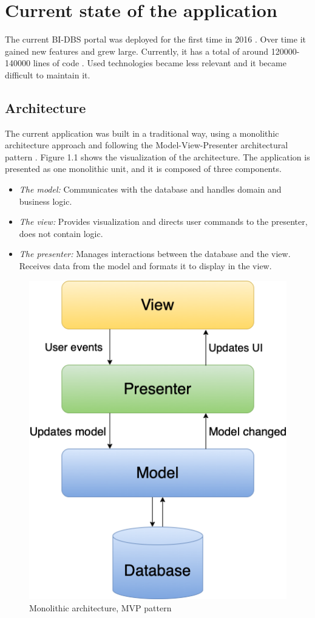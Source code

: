 \section{Current state of the application}
The current BI-DBS portal was deployed for the first time in 2016 \cite{bt-malec}. Over time it gained new features and grew large. Currently, it has a total of around 120000-140000 lines of code \cite{mt-plyskach}. Used technologies became less relevant and it became difficult to maintain it.

\subsection{Architecture}
The current application was built in a traditional way, using a monolithic architecture approach and following the Model-View-Presenter architectural pattern \cite{mvp-potel} \cite{architecture-haris}. Figure 1.1 shows the visualization of the architecture. The application is presented as one monolithic unit, and it is composed  of three components. 

\begin{itemize}
  \item \emph{The model:} Communicates with the database and handles domain and business logic.
  \item \emph{The view:} Provides visualization and directs user commands to the presenter, does not contain logic.
  \item \emph{The presenter:} Manages interactions between the database and the view. Receives data from the model and formats it to display in the view.
\end{itemize}

\begin{figure}[hp]
\centering
\includegraphics[scale=0.52]{../png/mvp_monolithic.png}
\caption{Monolithic architecture, MVP pattern}
\end{figure}

